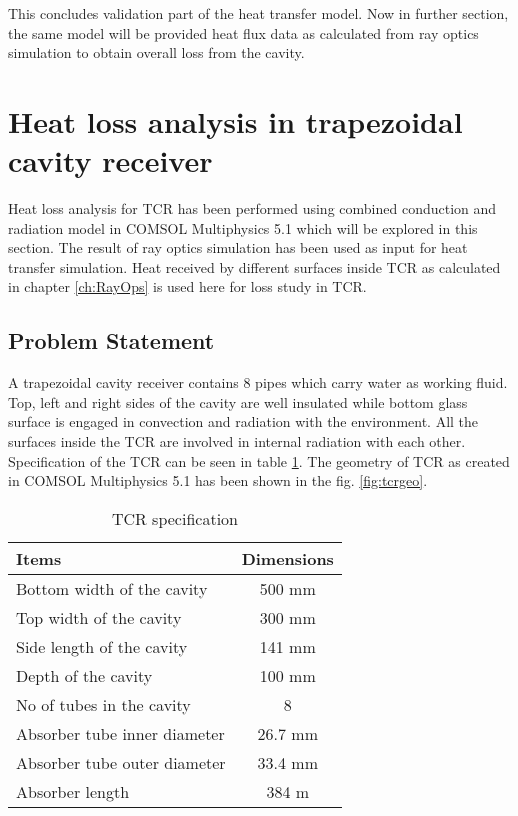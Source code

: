 This concludes validation part of the heat transfer model. Now in further section, the same model will be provided heat flux data as calculated from ray optics simulation to obtain overall loss from the cavity.

\section{Heat loss analysis in trapezoidal cavity receiver}
Heat loss analysis for TCR has been performed using combined conduction and radiation model in COMSOL Multiphysics 5.1 which will be explored in this section. The result of ray optics simulation has been used as input for heat transfer simulation. Heat received by different surfaces inside TCR as calculated in chapter \ref{ch:RayOps} is used here for loss study in TCR.

\subsection{Problem Statement}
A trapezoidal cavity receiver contains 8 pipes which carry water as working fluid. Top, left and right sides of the cavity are well insulated while bottom glass surface is engaged in convection and radiation with the environment. All the surfaces inside the TCR are involved in internal radiation with each other. Specification of the TCR can be seen in table \ref{tab:tcrspectab}. The geometry of TCR as created in COMSOL Multiphysics 5.1 has been shown in the fig. \ref{fig:tcrgeo}.

\begin{table}[H]
\centering
\caption{TCR specification}
\label{tab:tcrspectab}
\begin{tabular}{@{}|l|c|@{}}
\toprule
\textbf{Items}                      & \textbf{Dimensions} \\ \midrule
Bottom width of the cavity          & 500 mm              \\ \midrule
Top width of the cavity             & 300 mm              \\ \midrule
Side length of the cavity           & 141 mm              \\ \midrule
Depth of the cavity                 & 100 mm              \\ \midrule
No of tubes in the cavity           & 8                   \\ \midrule
Absorber tube inner diameter        & 26.7 mm             \\ \midrule
Absorber tube outer diameter        & 33.4 mm             \\ \midrule
Absorber length                     & 384 m               \\ \bottomrule
\end{tabular}
\end{table}

